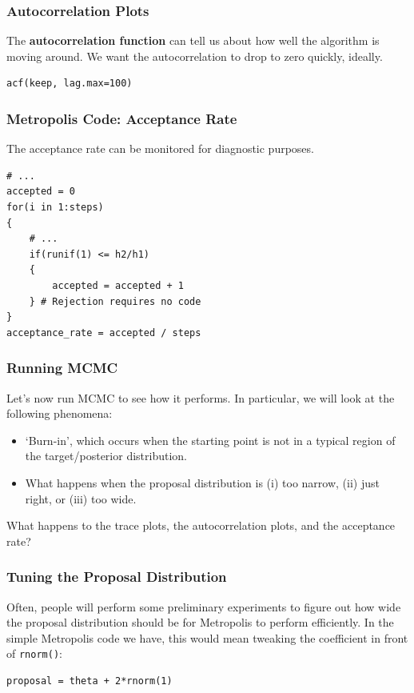 \documentclass{beamer}
\begin{document}
\begin{frame}[fragile]
\frametitle{Autocorrelation Plots}
The {\bf autocorrelation function} can tell us about how well the algorithm
is moving around. We want the autocorrelation to drop to zero quickly, ideally.

\begin{verbatim}
acf(keep, lag.max=100)
\end{verbatim}

\end{frame}




\begin{frame}[fragile]
\frametitle{Metropolis Code: Acceptance Rate}
The acceptance rate can be monitored for diagnostic purposes.
\small
\begin{verbatim}
# ...
accepted = 0
for(i in 1:steps)
{
    # ...
    if(runif(1) <= h2/h1)
    {
        accepted = accepted + 1
    } # Rejection requires no code
}
acceptance_rate = accepted / steps
\end{verbatim}

\end{frame}




\begin{frame}
\frametitle{Running MCMC}
Let's now run MCMC to see how it performs. In particular, we will look at
the following phenomena:
\begin{itemize}
\item `Burn-in', which occurs when the starting point is not in a typical region
of the target/posterior distribution.\pause
\item What happens when the proposal distribution is (i) too narrow,
(ii) just right, or (iii) too wide.
\end{itemize}
\pause
What happens to the trace plots, the autocorrelation plots, and the acceptance
rate?

\end{frame}



\begin{frame}[fragile]
\frametitle{Tuning the Proposal Distribution}
Often, people will perform some preliminary experiments to figure out how
wide the proposal distribution should be for Metropolis to perform efficiently.
In the simple Metropolis code we have, this would mean tweaking the
coefficient in front of \texttt{rnorm()}:

\begin{verbatim}
proposal = theta + 2*rnorm(1)
\end{verbatim}

\end{frame}
\end{document}

